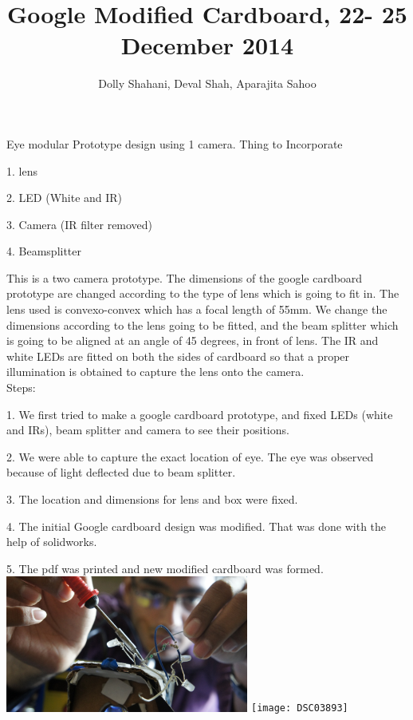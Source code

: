 \documentclass[12pt]{article}
\title{Google Modified Cardboard, 22- 25 December 2014}
\author{Dolly Shahani, Deval Shah, Aparajita Sahoo}
\begin{document}
\maketitle
Eye modular Prototype design using 1 camera.
Thing to Incorporate 

  1. lens 

  2. LED (White and IR)
	
  3. Camera (IR filter removed)

  4. Beamsplitter 

This is a two camera prototype. The dimensions of the google cardboard prototype are changed according to the type of lens which is going to fit in. The lens used is convexo-convex which has a focal length of 55mm. We change the dimensions according to the lens going to be fitted, and the beam splitter which is going to be aligned at an angle of 45 degrees, in front of lens. The IR and white LEDs are fitted on both the sides of cardboard so that a proper illumination is obtained to capture the lens onto the camera. \\
Steps:

1. We first tried to make a google cardboard prototype, and fixed LEDs (white and IRs), beam splitter and camera to see their positions. 

2. We were able to capture the exact location of eye. The eye was observed because of light deflected due to beam splitter.

3. The location and dimensions for lens and box were fixed.

4. The initial Google cardboard design was modified. That was done with the help of solidworks. 

5. The pdf was printed and new modified 
cardboard was formed. \\

\includegraphics[width=8cm]{gh}
\texttt{[image: DSC03893]}
\end{document}
